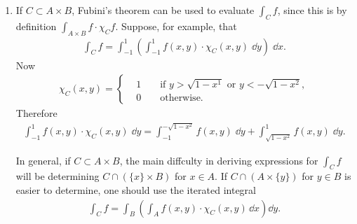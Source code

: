 \begin{enumerate}[label={\textup{\arabic*.\,}}]
    \item If $C\subset A\times B$, Fubini's theorem can be used to evaluate $\int_Cf$, since 
        this is by definition $\int_{A\times B}f\cdot \chi_Cf$. Suppose, for example, that 
        \begin{align*}
            \int_C f 
            = \int_{-1}^1 \left(\int_{-1}^1 f(x, y)\cdot \chi_C(x,y)\;\dd y\right)\;\dd x.
        \end{align*}
        Now 
        \begin{align*}
            \chi_C(x, y)
            = \left\{\begin{aligned}
                & 1 && \text{ if $y>\sqrt{1-x^1}$ or $y<-\sqrt{1-x^2}$},\\
                & 0 && \text{ otherwise}.
            \end{aligned}\right.
        \end{align*}
        Therefore 
        \begin{align*}
            \int_{-1}^1 f(x,y)\cdot \chi_C(x,y)\;\dd y
            = \int_{-1}^{-\sqrt{1-x^2}} f(x, y)\;\dd y 
                + \int_{\sqrt{1-x^2}}^{1} f(x, y)\;\dd y.
        \end{align*} 

        In general, if $C\subset A\times B$, the main diffculty in deriving expressions for 
        $\int_C f$ will be determining  $C\cap (\{x\}\times B)$ for $x\in A$. If $C\cap (A\times \{y\})$
        for $y\in B$ is easier to determine, one should use the iterated integral
        \begin{align*}
            \int_C f 
            = \int_B\left(\int_A f(x, y)\cdot \chi_C(x, y)\,\dd x \right)\dd y.
        \end{align*}
\end{enumerate}

